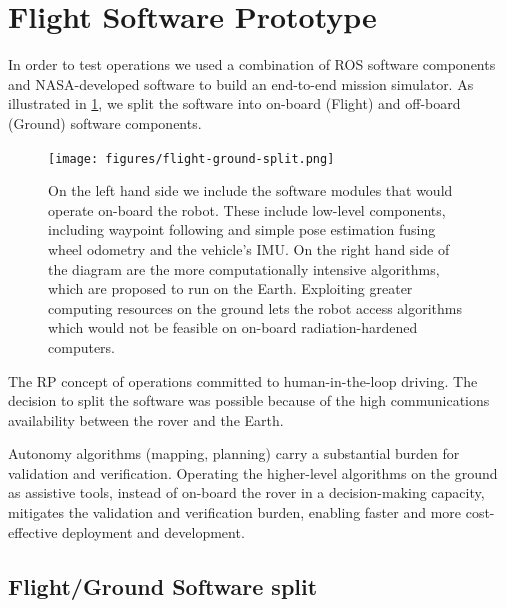 \documentclass[twocolumn,letterpaper]{IEEEAerospaceCLS}  %
\begin{document}
\section{Flight Software Prototype}
\label{sec:flight-software}


In order to test operations we used a combination of ROS software components and NASA-developed software to build an end-to-end mission simulator.  As illustrated in \cref{fig:rp-software}, we split the software into on-board (Flight) and off-board (Ground) software components.  

\begin{figure}
\centering
\texttt{[image: figures/flight-ground-split.png]}
\caption{On the left hand side we include the software modules that would operate on-board the robot.  These include low-level components, including waypoint following and simple pose estimation fusing wheel odometry and the vehicle's IMU.  
On the right hand side of the diagram are the more computationally intensive algorithms, which are proposed to run on the Earth.  Exploiting greater computing resources on the ground lets the robot access algorithms which would not be feasible on on-board radiation-hardened computers. \label{fig:rp-software}}
\end{figure}

The RP concept of operations committed to human-in-the-loop driving.  The decision to split the software was possible because of the high communications availability between the rover and the Earth.  

Autonomy algorithms (mapping, planning) carry a substantial burden for validation and verification. Operating the higher-level algorithms on the ground as assistive tools, instead of on-board the rover in a decision-making capacity, mitigates the validation and verification burden, enabling faster and more cost-effective deployment and development.


\subsection{Flight/Ground Software split}
\end{document}
